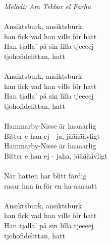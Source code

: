 {\footnotesize\textit{Melodi: Am Tekbar el Farha}}\\
\\
Ansiktsburk, ansiktsburk\\
han fick vad han ville för hatt\\
Han tjalla' på sin lilla tjeeeej\\
tjohofidelittan, hatt\\
\\
Ansiktsburk, ansiktsburk\\
han fick vad han ville för hatt\\
Han tjalla' på sin lilla tjeeeej\\
tjohofidelittan, hatt\\
\\
Hammarby-Nisse är haaaarlig\\
Bitter e han ej - ja, jääääävligt\\
Hammarby-Nisse är haaaarlig\\
Bitter e han ej - jaha, jääääävligt\\
\\
När hatten har blitt färdig\\
rasar han in för en ha-aaaaatt\\
\\
Ansiktsburk, ansiktsburk\\
han fick vad han ville för hatt\\
Han tjalla' på sin lilla tjeeeej\\
tjohofidelittan, hatt

